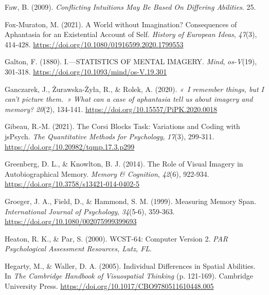 \documentclass[
  12pt,
]{article}
\newlength{\cslhangindent}
\newlength{\cslentryspacingunit} %
\newenvironment{CSLReferences}[2] %
 {%
  \setlength{\parindent}{0pt}
  \ifodd #1
  \let\oldpar\par
  \def\par{\hangindent=\cslhangindent\oldpar}
  \fi
  \setlength{\parskip}{#2\cslentryspacingunit}
 }%
 {}
\begin{document}
\begin{CSLReferences}{1}{0}
\leavevmode{}%
Faw, B. (2009). \emph{Conflicting {Intuitions May Be Based On Differing
Abilities}}. 25.

\leavevmode{}%
Fox-Muraton, M. (2021). A World without Imagination? {Consequences} of
Aphantasia for an Existential Account of Self. \emph{History of European
Ideas}, \emph{47}(3), 414‑428.
\url{https://doi.org/10.1080/01916599.2020.1799553}

\leavevmode{}%
Galton, F. (1880). I.---{STATISTICS OF MENTAL IMAGERY}. \emph{Mind},
\emph{os-V}(19), 301‑318. \url{https://doi.org/10.1093/mind/os-V.19.301}

\leavevmode{}%
Ganczarek, J., Żurawska-Żyła, R., \& Rolek, A. (2020). \emph{{«~I
remember things, but I can't picture them.~»} What can a case of
aphantasia tell us about imagery and memory?} \emph{20}(2), 134‑141.
\url{https://doi.org/10.15557/PiPK.2020.0018}

\leavevmode{}%
Gibeau, R.-M. (2021). The {Corsi Blocks Task}: {Variations} and Coding
with {jsPsych}. \emph{The Quantitative Methods for Psychology},
\emph{17}(3), 299‑311. \url{https://doi.org/10.20982/tqmp.17.3.p299}

\leavevmode{}%
Greenberg, D. L., \& Knowlton, B. J. (2014). The Role of Visual Imagery
in Autobiographical Memory. \emph{Memory \& Cognition}, \emph{42}(6),
922‑934. \url{https://doi.org/10.3758/s13421-014-0402-5}

\leavevmode{}%
Groeger, J. A., Field, D., \& Hammond, S. M. (1999). Measuring Memory
Span. \emph{International Journal of Psychology}, \emph{34}(5-6),
359‑363. \url{https://doi.org/10.1080/002075999399693}

\leavevmode{}%
Heaton, R. K., \& Par, S. (2000). {WCST-64}: Computer Version 2.
\emph{PAR Psychological Assessment Resources, Lutz, FL}.

\leavevmode{}%
Hegarty, M., \& Waller, D. A. (2005). Individual {Differences} in
{Spatial Abilities}. In \emph{The {Cambridge Handbook} of {Visuospatial
Thinking}} (p. 121‑169). {Cambridge University Press}.
\url{https://doi.org/10.1017/CBO9780511610448.005}


\end{CSLReferences}
\end{document}

